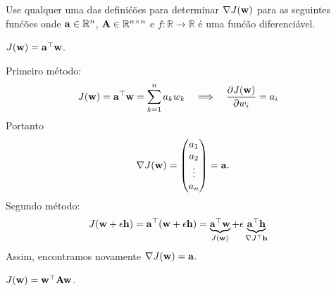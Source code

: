 Use qualquer uma das defini\'c\~oes para determinar $\nabla J(\mathbf{w})$ para as seguintes fun\'c\~oes onde $\mathbf{a} \in \mathbb{R}^n$, $\mathbf{A} \in \mathbb{R}^{n \times n}$ e
$f: \mathbb{R} \rightarrow \mathbb{R}$ \'e uma fun\'c\~ao diferenci\'avel.
\begin{exenumerate}
    \item $J(\mathbf{w})=\mathbf{a}^\top \mathbf{w}$.
    
    \begin{solution}
        Primeiro m\'etodo:
        \begin{align}
            J(\mathbf{w}) &= \mathbf{a}^\top\mathbf{w} = \sum_{k=1}^n a_kw_k& \implies&& \frac{\partial{J(\mathbf{w})}}{\partial{w_i}} &= a_i
        \end{align}
        Portanto
        \begin{equation}
            \nabla J(\mathbf{w}) = \begin{pmatrix} a_1 \\ a_2 \\ \vdots \\ a_n \end{pmatrix} = \mathbf{a}.
        \end{equation}
        Segundo m\'etodo:
        \begin{align}
            J(\mathbf{w} + \epsilon\mathbf{h}) &= \mathbf{a}^\top(\mathbf{w} + \epsilon\mathbf{h}) = \underbrace{\mathbf{a}^\top\mathbf{w}}_{J(\mathbf{w})} + \epsilon \underbrace{\mathbf{a}^\top \mathbf{h}}_{\nabla J^\top\mathbf{h}}
        \end{align}
        Assim, encontramos novamente $\nabla J(\mathbf{w}) = \mathbf{a}. $
    \end{solution}
    
    \item $J(\mathbf{w})=\mathbf{w}^\top \mathbf{A}\mathbf{w}$.
    

\end{exenumerate}
